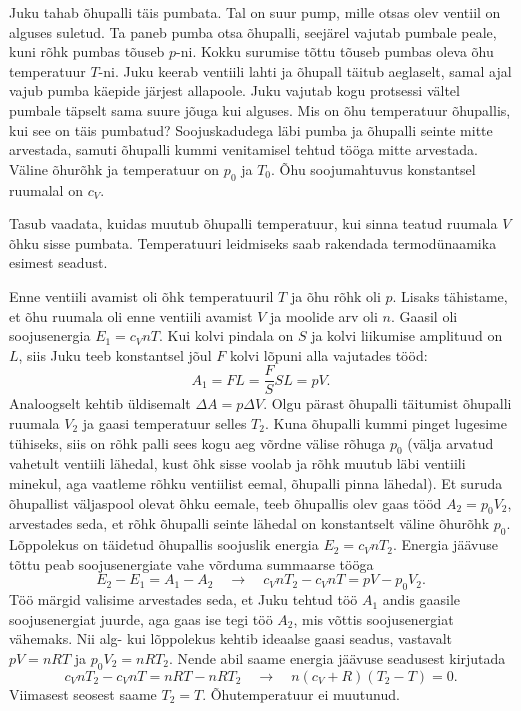 
Juku tahab õhupalli täis pumbata. Tal on suur pump, mille otsas olev ventiil on alguses suletud. Ta paneb pumba otsa õhupalli, seejärel vajutab pumbale peale, kuni rõhk pumbas tõuseb $p$-ni. Kokku surumise tõttu tõuseb pumbas oleva õhu temperatuur $T$-ni. Juku keerab ventiili lahti ja õhupall täitub aeglaselt, samal ajal vajub pumba käepide järjest allapoole. Juku vajutab kogu protsessi vältel pumbale täpselt sama suure jõuga kui alguses. Mis on õhu temperatuur õhupallis, kui see on täis pumbatud? Soojuskadudega läbi pumba ja õhupalli seinte mitte arvestada, samuti õhupalli kummi venitamisel tehtud tööga mitte arvestada. Väline õhurõhk ja temperatuur on $p_0$ ja $T_0$. Õhu soojumahtuvus konstantsel ruumalal on $c_V$.

\hint
Tasub vaadata, kuidas muutub õhupalli temperatuur, kui sinna teatud ruumala $V$ õhku sisse pumbata. Temperatuuri leidmiseks saab rakendada termodünaamika esimest seadust.

\solu
Enne ventiili avamist oli õhk temperatuuril $T$ ja õhu rõhk oli $p$. Lisaks tähistame, et õhu ruumala oli enne ventiili avamist $V$ ja moolide arv oli $n$. Gaasil oli soojusenergia $E_1=c_VnT$. Kui kolvi pindala on $S$ ja kolvi liikumise amplituud on $L$, siis Juku teeb konstantsel jõul $F$ kolvi lõpuni alla vajutades tööd:
$$A_1=FL=\frac{F}{S}SL=pV.$$
Analoogselt kehtib üldisemalt $\Delta A = p \Delta V$. Olgu pärast õhupalli täitumist õhupalli ruumala $V_2$ ja gaasi temperatuur selles $T_2$. Kuna õhupalli kummi pinget lugesime tühiseks, siis on rõhk palli sees kogu aeg võrdne välise rõhuga $p_0$ (välja arvatud vahetult ventiili lähedal, kust õhk sisse voolab ja rõhk muutub läbi ventiili minekul, aga vaatleme rõhku ventiilist eemal, õhupalli pinna lähedal). Et suruda õhupallist väljaspool olevat õhku eemale, teeb õhupallis olev gaas tööd $A_2=p_0V_2$, arvestades seda, et rõhk õhupalli seinte lähedal on konstantselt väline õhurõhk $p_0$. Lõppolekus on täidetud õhupallis soojuslik energia $E_2=c_VnT_2$. Energia jäävuse tõttu peab soojusenergiate vahe võrduma summaarse tööga
$$E_2-E_1 = A_1-A_2 \quad\rightarrow\quad c_VnT_2-c_VnT = pV - p_0V_2.$$
Töö märgid valisime arvestades seda, et Juku tehtud töö $A_1$ andis gaasile soojusenergiat juurde, aga gaas ise tegi töö $A_2$, mis võttis soojusenergiat vähemaks. Nii alg- kui lõppolekus kehtib ideaalse gaasi seadus, vastavalt $pV=nRT$ ja $p_0V_2=nRT_2$. Nende abil saame energia jäävuse seadusest kirjutada
$$c_VnT_2-c_VnT = nRT-nRT_2 \quad\rightarrow\quad n(c_V+R)(T_2-T)=0.$$
Viimasest seosest saame $T_2=T$. Õhutemperatuur ei muutunud.

